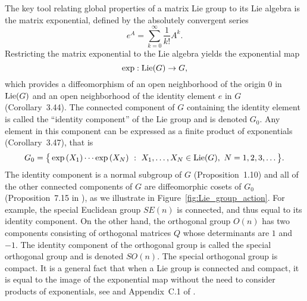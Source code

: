\documentclass[twoside,11pt]{article}
\begin{document}
The key tool relating global properties of a matrix Lie group to its Lie algebra
is the matrix exponential, defined by the absolutely convergent series
\begin{equation}
    e^A = \sum_{k=0}^{\infty} \frac{1}{k!} A^k.
\end{equation}
Restricting the matrix exponential to the Lie algebra yields the exponential map 
$$\exp: \operatorname{Lie}(G) \to G,$$
which provides a diffeomorphism of an open neighborhood of the origin $0$ in $\operatorname{Lie}(G)$ and an open neighborhood of the identity element $e$ in $G$ (Corollary~3.44).
The connected component of $G$ containing the identity element is called the ``identity component'' of the Lie group and is denoted $G_0$.
Any element in this component can be expressed as a finite product of exponentials (Corollary~3.47), that is
\begin{equation}
    G_0 = \big\{ \exp{(X_1)} \cdots \exp{(X_N)} \ : \ X_1, \ldots, X_N \in \operatorname{Lie}(G), \ N = 1, 2, 3, \ldots \big\}.
\end{equation}
The identity component is a normal subgroup of $G$ (Proposition~1.10) and all of the other connected components of $G$ are diffeomorphic cosets of $G_0$ (Proposition~7.15 in \cite{Lee2013introduction}), as we illustrate in Figure~\ref{fig:Lie_group_action}.
For example, the special Euclidean group $SE(n)$ is connected, and thus equal to its identity component.
On the other hand, the orthogonal group $O(n)$ has two components consisting of orthogonal matrices $Q$ whose determinants are $1$ and $-1$.
The identity component of the orthogonal group is called the special orthogonal group and is denoted $SO(n)$.
The special orthogonal group is compact.
It is a general fact that when a Lie group is connected and compact, it is equal to the image of the exponential map without the need to consider products of exponentials, see \cite{Tao2011expsurjective} and Appendix~C.1 of \cite{Lezcano2019cheap}.
\end{document}
